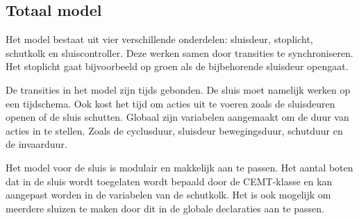 \documentclass[../verslag.tex]{subfiles}
\begin{document}
\subsection{Totaal model}

Het model bestaat uit vier verschillende onderdelen: sluisdeur, stoplicht, schutkolk en sluiscontroller. Deze werken samen door transities te synchroniseren. Het stoplicht gaat bijvoorbeeld op groen als de bijbehorende sluisdeur opengaat.

De transities in het model zijn tijds gebonden. De sluis moet namelijk werken op een tijdschema. Ook kost het tijd om acties uit te voeren zoals de sluisdeuren openen of de sluis schutten. Globaal zijn variabelen aangemaakt om de duur van acties in te stellen. Zoals de cyclusduur, sluisdeur bewegingsduur, schutduur en de invaarduur.

Het model voor de sluis is modulair en makkelijk aan te passen. Het aantal boten dat in de sluis wordt toegelaten wordt bepaald door de CEMT-klasse en kan aangepast worden in de variabelen van de schutkolk. Het is ook mogelijk om meerdere sluizen te maken door dit in de globale declaraties aan te passen.
\end{document}
